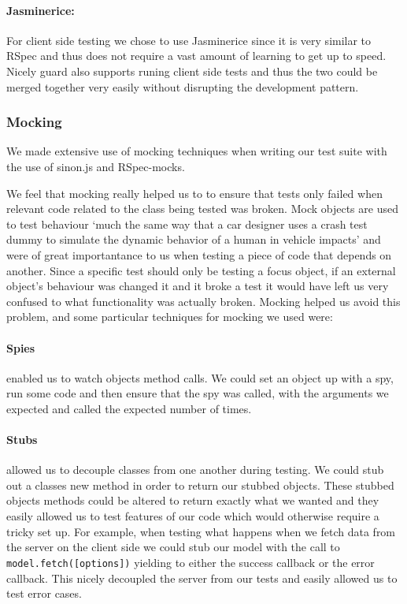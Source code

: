     \paragraph{Jasminerice:}
      For client side testing we chose to use Jasminerice since it is very similar to RSpec and thus does not require a vast amount of learning to get up to speed. Nicely guard also supports runing client side tests and thus the two could be merged together very easily without disrupting the development pattern.

  \subsubsection{Mocking}
    We made extensive use of mocking techniques when writing our test suite with the use of sinon.js\cite{sinon} and RSpec-mocks\cite{rspec_mocks}.

    We feel that mocking really helped us to to ensure that tests only failed when relevant code related to the class being tested was broken. Mock objects are used to test behaviour `much the same way that a car designer uses a crash test dummy to simulate the dynamic behavior of a human in vehicle impacts'\cite{mock_quote} and were of great importantance to us when testing a piece of code that depends on another.
    Since a specific test should only be testing a focus object, if an external object's behaviour was changed it and it broke a test it would have left us very confused to what functionality was actually broken. Mocking helped us avoid this problem, and some particular techniques for mocking we used were:
    
    \paragraph{Spies} enabled us to watch objects method calls. We could set an object up with a spy, run some code and then ensure that the spy was called, with the arguments we expected and called the expected number of times.

    \paragraph{Stubs} allowed us to decouple classes from one another during testing. We could stub out a classes new method in order to return our stubbed objects.
    These stubbed objects methods could be altered to return exactly what we wanted and they easily allowed us to test features of our code which would otherwise require a tricky set up.
    For example, when testing what happens when we fetch data from the server on the client side we could stub our model with the call to \verb!model.fetch([options])! yielding to either the success callback or the error callback.
    This nicely decoupled the server from our tests and easily allowed us to test error cases.



